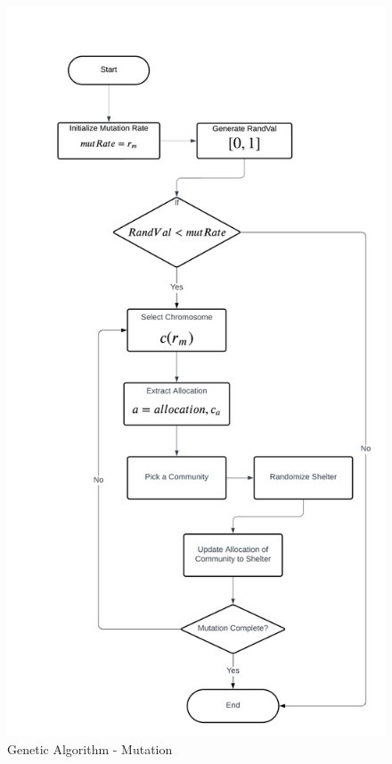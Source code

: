 \begin{appendices}
\begin{centerappendixtitle}
		\begin{figure}[h]
			\centering
			\caption{Genetic Algorithm - Mutation}
			\label{mutateFlow}
			\includegraphics[width=\linewidth]{appendix/mutate f}
		\end{figure}
		

\end{centerappendixtitle}
\end{appendices}
